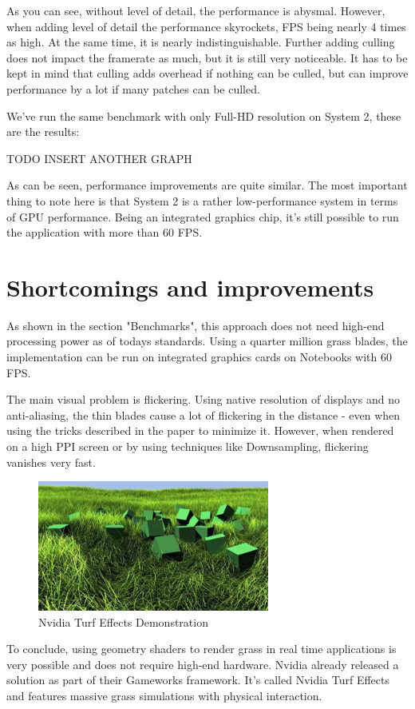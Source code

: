 \documentclass[conference]{acmsiggraph}
\begin{document}
As you can see, without level of detail, the performance is abysmal. However, when adding level of detail the performance skyrockets, FPS being nearly 4 times as high. At the same time, it is nearly indistinguishable. Further adding culling does not impact the framerate as much, but it is still very noticeable. It has to be kept in mind that culling adds overhead if nothing can be culled, but can improve performance by a lot if many patches can be culled.

We've run the same benchmark with only Full-HD resolution on System 2, these are the results:

TODO INSERT ANOTHER GRAPH

As can be seen, performance improvements are quite similar. The most important thing to note here is that System 2 is a rather low-performance system in terms of GPU performance. Being an integrated graphics chip, it's still possible to run the application with more than 60 FPS.

\section{Shortcomings and improvements}

As shown in the section "Benchmarks", this approach does not need high-end processing power as of todays standards. Using a quarter million grass blades, the implementation can be run on integrated graphics cards on Notebooks with 60 FPS.

The main visual problem is flickering. Using native resolution of displays and no anti-aliasing, the thin blades cause a lot of flickering in the distance - even when using the tricks described in the paper to minimize it. However, when rendered on a high PPI screen or by using techniques like Downsampling, flickering vanishes very fast.

 \begin{figure}[ht]
   \centering
   \includegraphics[width=3.0in]{images/turf_effects}
   \caption{Nvidia Turf Effects Demonstration}
 \end{figure}    

To conclude, using geometry shaders to render grass in real time applications is very possible and does not require high-end hardware. Nvidia already released a solution as part of their Gameworks framework. It's called Nvidia Turf Effects and features massive grass simulations with physical interaction.



\end{document}

